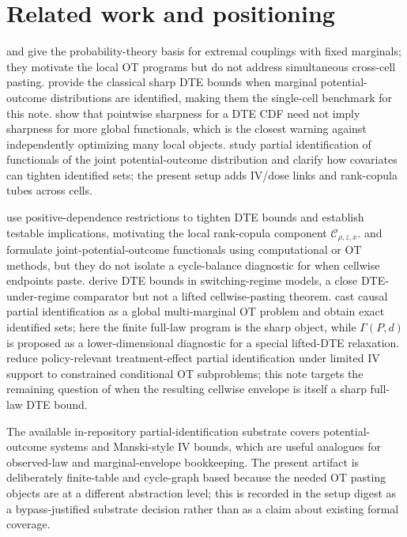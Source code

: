 \documentclass[11pt]{article}
\theoremstyle{definition}
\theoremstyle{plain}
\theoremstyle{remark}
\begin{document}
\section{Related work and positioning}
\cite{Makarov1981} and \cite{Rueschendorf1982} give the probability-theory basis for extremal couplings with fixed marginals; they motivate the local OT programs but do not address simultaneous cross-cell pasting.  \cite{FanPark2010} provide the classical sharp DTE bounds when marginal potential-outcome distributions are identified, making them the single-cell benchmark for this note.  \cite{FirpoRidder2019} show that pointwise sharpness for a DTE CDF need not imply sharpness for more global functionals, which is the closest warning against independently optimizing many local objects.  \cite{FanGuerreZhu2017} study partial identification of functionals of the joint potential-outcome distribution and clarify how covariates can tighten identified sets; the present setup adds IV/dose links and rank-copula tubes across cells.

\cite{FrandsenLefgren2021} use positive-dependence restrictions to tighten DTE bounds and establish testable implications, motivating the local rank-copula component \(\mathcal C_{\rho,z,x}\).  \cite{Russell2021} and \cite{OberReynolds2023} formulate joint-potential-outcome functionals using computational or OT methods, but they do not isolate a cycle-balance diagnostic for when cellwise endpoints paste.  \cite{FanWu2010} derive DTE bounds in switching-regime models, a close DTE-under-regime comparator but not a lifted cellwise-pasting theorem.  \cite{GaoGeQian2025} cast causal partial identification as a global multi-marginal OT problem and obtain exact identified sets; here the finite full-law program is the sharp object, while \(\Gamma(P,d)\) is proposed as a lower-dimensional diagnostic for a special lifted-DTE relaxation.  \cite{TanBlanchetSyrgkanis2026} reduce policy-relevant treatment-effect partial identification under limited IV support to constrained conditional OT subproblems; this note targets the remaining question of when the resulting cellwise envelope is itself a sharp full-law DTE bound.

The available in-repository partial-identification substrate covers potential-outcome systems and Manski-style IV bounds, which are useful analogues for observed-law and marginal-envelope bookkeeping.  The present artifact is deliberately finite-table and cycle-graph based because the needed OT pasting objects are at a different abstraction level; this is recorded in the setup digest as a bypass-justified substrate decision rather than as a claim about existing formal coverage.
\end{document}
